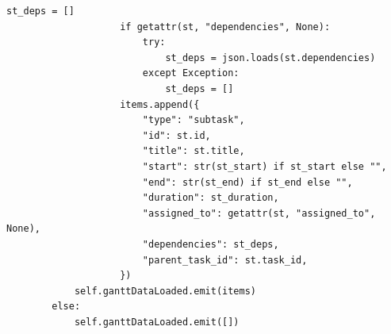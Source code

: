 \documentclass{report}
\begin{document}
\begin{lstlisting}[style=pythonstyle]
                    st_deps = []
                    if getattr(st, "dependencies", None):
                        try:
                            st_deps = json.loads(st.dependencies)
                        except Exception:
                            st_deps = []
                    items.append({
                        "type": "subtask",
                        "id": st.id,
                        "title": st.title,
                        "start": str(st_start) if st_start else "",
                        "end": str(st_end) if st_end else "",
                        "duration": st_duration,
                        "assigned_to": getattr(st, "assigned_to", None),
                        "dependencies": st_deps,
                        "parent_task_id": st.task_id,
                    })
            self.ganttDataLoaded.emit(items)
        else:
            self.ganttDataLoaded.emit([])


\end{lstlisting}
\end{document}
